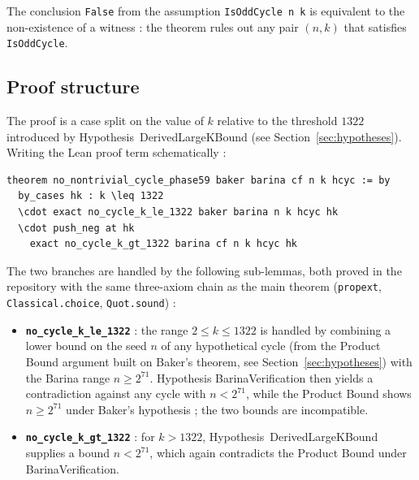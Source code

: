 The conclusion \texttt{False} from the assumption \texttt{IsOddCycle n k}
is equivalent to the non-existence of a witness : the theorem rules out
any pair \((n, k)\) that satisfies \texttt{IsOddCycle}.

\subsection{Proof structure}

The proof is a case split on the value of \(k\) relative to the threshold
\(1322\) introduced by Hypothesis~\textsf{DerivedLargeKBound}
(see Section~\ref{sec:hypotheses}). Writing the Lean proof term
schematically :

\begin{lstlisting}
theorem no_nontrivial_cycle_phase59 baker barina cf n k hcyc := by
  by_cases hk : k \leq 1322
  \cdot exact no_cycle_k_le_1322 baker barina n k hcyc hk
  \cdot push_neg at hk
    exact no_cycle_k_gt_1322 barina cf n k hcyc hk
\end{lstlisting}

The two branches are handled by the following sub-lemmas, both proved in
the repository with the same three-axiom chain as the main theorem
(\texttt{propext}, \texttt{Classical.choice}, \texttt{Quot.sound}) :

\begin{itemize}
  \item \textbf{\texttt{no\_cycle\_k\_le\_1322}} : the range \(2 \leq k
        \leq 1322\) is handled by combining a lower bound on the seed
        \(n\) of any hypothetical cycle (from the Product Bound argument
        built on Baker's theorem, see Section~\ref{sec:hypotheses}) with
        the Barina range \(n \geq 2^{71}\). Hypothesis
        \textsf{BarinaVerification} then yields a contradiction against
        any cycle with \(n < 2^{71}\), while the Product Bound shows
        \(n \geq 2^{71}\) under Baker's hypothesis ; the two bounds are
        incompatible.
  \item \textbf{\texttt{no\_cycle\_k\_gt\_1322}} : for \(k > 1322\),
        Hypothesis~\textsf{DerivedLargeKBound} supplies a bound
        \(n < 2^{71}\), which again contradicts the Product Bound under
        \textsf{BarinaVerification}.
\end{itemize}


